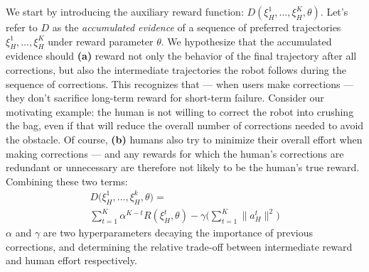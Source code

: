 \smallskip
{} We start by introducing the auxiliary reward function: $D(\xi_H^1, \ldots, \xi_H^K, \theta)$. Let's refer to $D$ as the \textit{accumulated evidence} of a sequence of preferred trajectories $\xi_H^1, \ldots, \xi_H^K$ under reward parameter $\theta$. We hypothesize that the accumulated evidence should \textbf{(a)} reward not only the behavior of the final trajectory after all corrections, but also the intermediate trajectories the robot follows during the sequence of corrections. This recognizes that --- when users make corrections --- they don't sacrifice long-term reward for short-term failure. Consider our motivating example: the human is not willing to correct the robot into crushing the bag, even if that will reduce the overall number of corrections needed to avoid the obstacle. Of course, \textbf{(b)} humans also try to minimize their overall effort when making corrections --- and any rewards for which the human's corrections are redundant or unnecessary are therefore not likely to be the human's true reward. Combining these two terms:
\begin{multline}
D\big(\xi_H^1, \ldots, \xi_H^{k},  \theta\big) =\\   
\sum_{t = 1}^{K} \alpha ^{K-t}R(\xi_H^t, \theta) - \gamma \Big(\sum_{t = 1}^K\|a_H^t\|^2\Big) 
\label{eq:D_def}
\end{multline}
$\alpha$ and $\gamma$ are two hyperparameters decaying the importance of previous corrections, and determining the relative trade-off between intermediate reward and human effort respectively.

